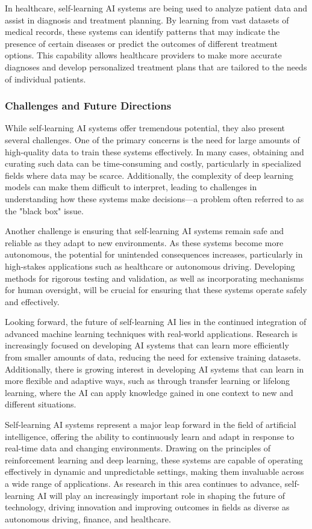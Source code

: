 \documentclass[12pt,twoside]{article}
\begin{document}
In healthcare, self-learning AI systems are being used to analyze patient data and assist in diagnosis and treatment planning. By learning from vast datasets of medical records, these systems can identify patterns that may indicate the presence of certain diseases or predict the outcomes of different treatment options. This capability allows healthcare providers to make more accurate diagnoses and develop personalized treatment plans that are tailored to the needs of individual patients.

\subsubsection{Challenges and Future Directions}

While self-learning AI systems offer tremendous potential, they also present several challenges. One of the primary concerns is the need for large amounts of high-quality data to train these systems effectively. In many cases, obtaining and curating such data can be time-consuming and costly, particularly in specialized fields where data may be scarce. Additionally, the complexity of deep learning models can make them difficult to interpret, leading to challenges in understanding how these systems make decisions—a problem often referred to as the "black box" issue.

Another challenge is ensuring that self-learning AI systems remain safe and reliable as they adapt to new environments. As these systems become more autonomous, the potential for unintended consequences increases, particularly in high-stakes applications such as healthcare or autonomous driving. Developing methods for rigorous testing and validation, as well as incorporating mechanisms for human oversight, will be crucial for ensuring that these systems operate safely and effectively.

Looking forward, the future of self-learning AI lies in the continued integration of advanced machine learning techniques with real-world applications. Research is increasingly focused on developing AI systems that can learn more efficiently from smaller amounts of data, reducing the need for extensive training datasets. Additionally, there is growing interest in developing AI systems that can learn in more flexible and adaptive ways, such as through transfer learning or lifelong learning, where the AI can apply knowledge gained in one context to new and different situations.

Self-learning AI systems represent a major leap forward in the field of artificial intelligence, offering the ability to continuously learn and adapt in response to real-time data and changing environments. Drawing on the principles of reinforcement learning and deep learning, these systems are capable of operating effectively in dynamic and unpredictable settings, making them invaluable across a wide range of applications. As research in this area continues to advance, self-learning AI will play an increasingly important role in shaping the future of technology, driving innovation and improving outcomes in fields as diverse as autonomous driving, finance, and healthcare.
\end{document}
